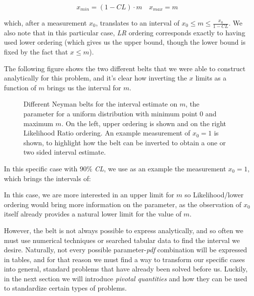 \begin{example}
	\[
	x_{min} = (1-CL)\cdot m \quad x_{max} = m
	\]
	
	which, after a measurement $x_0$, translates to an interval of $x_0\leq m \leq \frac{x_0}{1-CL}$. We also note that in this particular case, \emph{LR} ordering corresponds exactly to having used lower ordering (which gives us the upper bound, though the lower bound is fixed by the fact that $x\leq m$).
	
	The following figure shows the two different belts that we were able to construct analytically for this problem, and it's clear how inverting the $x$ limits as a function of $m$ brings us the interval for $m$.
	
		\begin{figure}[H]
		\centering
		
		\caption{Different Neyman belts for the interval estimate on $m$, the parameter for a uniform distribution with minimum point $0$ and maximum $m$. On the left, upper ordering is shown and on the right Likelihood Ratio ordering. An example measurement of $x_0=1$ is shown, to highlight how the belt can be inverted to obtain a one or two sided interval estimate.}
		\label{fig:uniform_belts}
	\end{figure}
	
	In this specific case with $90\%$ \emph{CL}, we use as an example the measurement $x_0=1$, which brings the intervals of:
		
		
		
	In this case, we are more interested in an upper limit for $m$ so Likelihood/lower ordering would bring more information on the parameter, as the observation of $x_0$ itself already provides a natural lower limit for the value of $m$. 
\end{example}

However, the belt is not always possible to express analytically, and so often we must use numerical techniques or searched tabular data to find the interval we desire. Naturally, not every possible parameter-\emph{pdf} combination will be expressed in tables, and for that reason we must find a way to transform our specific cases into general, standard problems that have already been solved before us. Luckily, in the next section we will introduce \emph{pivotal quantities} and how they can be used to standardize certain types of problems.
\\

